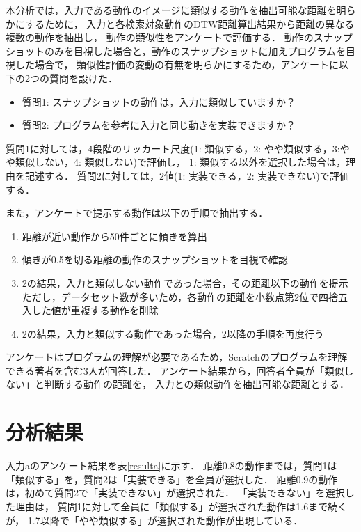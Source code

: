 \documentclass[11pt]{jreport}
\begin{document}
本分析では，入力である動作のイメージに類似する動作を抽出可能な距離を明らかにするために，
入力と各検索対象動作のDTW距離算出結果から距離の異なる複数の動作を抽出し，
動作の類似性をアンケートで評価する．
動作のスナップショットのみを目視した場合と，動作のスナップショットに加えプログラムを目視した場合で，
類似性評価の変動の有無を明らかにするため，アンケートに以下の2つの質問を設けた．

\begin{itemize}
    \item 質問1: スナップショットの動作は，入力に類似していますか？
    \item 質問2: プログラムを参考に入力と同じ動きを実装できますか？
\end{itemize}

質問1に対しては，4段階のリッカート尺度(1: 類似する，2: やや類似する，3:やや類似しない，4: 類似しない)で評価し，
1: 類似する以外を選択した場合は，理由を記述する．
質問2に対しては，2値(1: 実装できる，2: 実装できない)で評価する．

また，アンケートで提示する動作は以下の手順で抽出する．

\begin{enumerate}
    \item 距離が近い動作から50件ごとに傾きを算出
    \item 傾きが0.5を切る距離の動作のスナップショットを目視で確認
    \item 2の結果，入力と類似しない動作であった場合，その距離以下の動作を提示
    ただし，データセット数が多いため，各動作の距離を小数点第2位で四捨五入した値が重複する動作を削除
    \item 2の結果，入力と類似する動作であった場合，2以降の手順を再度行う
\end{enumerate}

アンケートはプログラムの理解が必要であるため，Scratchのプログラムを理解できる著者を含む3人が回答した．
アンケート結果から，回答者全員が「類似しない」と判断する動作の距離を，
入力との類似動作を抽出可能な距離とする．

\section{分析結果}
入力aのアンケート結果を表\ref{resulta}に示す．
距離0.8の動作までは，質問1は「類似する」を，質問2は「実装できる」を全員が選択した．
距離0.9の動作は，初めて質問2で「実装できない」が選択された．
「実装できない」を選択した理由は，
質問1に対して全員に「類似する」が選択された動作は1.6まで続くが，
1.7以降で「やや類似する」が選択された動作が出現している．
\end{document}
